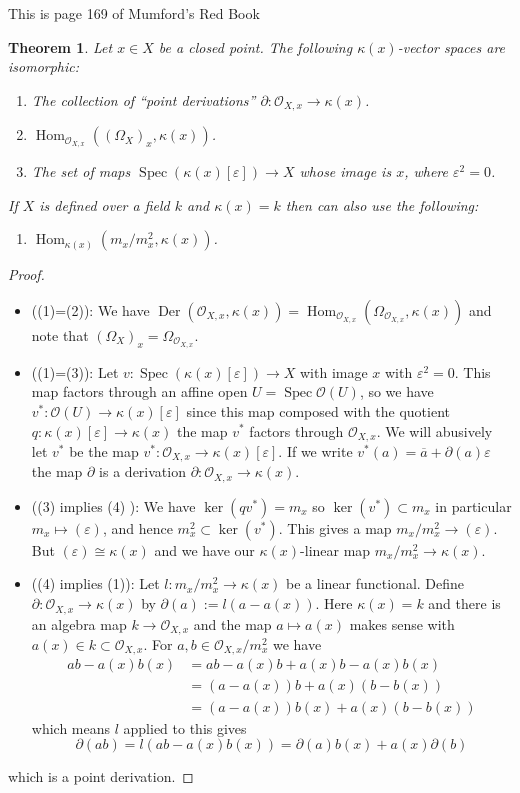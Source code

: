 \documentclass[12pt]{article}
\numberwithin{equation}{section}
\newtheorem{theorem}{Theorem}[subsection]
\theoremstyle{definition}
\theoremstyle{remark}
\newcommand{\Hom}{\operatorname{Hom}}
\newcommand{\Ocal}{\mathcal{O}}
\newcommand{\Spec}{\operatorname{Spec}}
\newcommand{\Der}{\operatorname{Der}}
\begin{document}
This is page 169 of Mumford's Red Book
\begin{theorem}
	Let $x\in X$ be a closed point. 
	The following $\kappa(x)$-vector spaces are isomorphic:
	\begin{enumerate}
		\item The collection of ``point derivations'' $\partial:\Ocal_{X,x}\to \kappa(x)$. 
		\item $\Hom_{\Ocal_{X,x}}((\Omega_{X})_x, \kappa(x))$.
		\item The set of maps $\Spec(\kappa(x)[\varepsilon]) \to X$ whose image is $x$, where $\varepsilon^2=0$.
	\end{enumerate}
If $X$ is defined over a field $k$ and $\kappa(x)=k$ then can also use the following:
\begin{enumerate}[resume]
		\item $\Hom_{\kappa(x)}(m_x/m_x^2,\kappa(x))$.
	\end{enumerate}
\end{theorem}

\begin{proof}
	\begin{itemize}
		\item ((1)=(2)): We have $\Der(\Ocal_{X,x},\kappa(x))=\Hom_{\Ocal_{X,x}}(\Omega_{\Ocal_{X,x}},\kappa(x))$ and note that $(\Omega_X)_x = \Omega_{\Ocal_{X,x}}$.
		\item ((1)=(3)): Let $v: \Spec(\kappa(x)[\varepsilon]) \to X$ with image $x$ with $\varepsilon^2=0$.
		This map factors through an affine open $U = \Spec\Ocal(U)$, so we have $v^*:\Ocal(U)\to \kappa(x)[\varepsilon]$ since this map composed with the quotient $q:\kappa(x)[\varepsilon] \to \kappa(x)$ the map $v^*$ factors through $\Ocal_{X,x}$. 
		We will abusively let $v^*$ be the map $v^*:\Ocal_{X,x}\to \kappa(x)[\varepsilon]$.
		If we write $v^*(a) = \overline{a} + \partial(a)\varepsilon$ the map $\partial$ is a derivation $\partial:\Ocal_{X,x} \to \kappa(x)$.
		\item ((3) implies (4) ): We have $\ker(qv^*)=m_x$ so $\ker(v^*) \subset m_x$ in particular $m_x\mapsto (\varepsilon)$, and hence $m_x^2 \subset \ker(v^*)$. 
		This gives a map $m_x/m_x^2 \to (\varepsilon)$. 
		But $(\varepsilon) \cong  \kappa(x)$ and we have our $\kappa(x)$-linear map $m_x/m_x^2 \to \kappa(x)$.
		\item ((4) implies (1)): Let $l:m_x/m_x^2\to \kappa(x)$ be a linear functional. Define $\partial: \Ocal_{X,x} \to \kappa(x)$ by $\partial(a) := l(a-a(x))$.
		Here $\kappa(x)=k$ and there is an algebra map $k\to \Ocal_{X,x}$ and the map $a\mapsto a(x)$ makes sense with $a(x)\in k\subset \Ocal_{X,x}$.
		For $a,b\in \Ocal_{X,x}/m_x^2$ we have 
		\begin{align*}
		ab-a(x)b(x) &= ab-a(x)b+a(x)b-a(x)b(x) \\
		&= (a-a(x))b+a(x)(b-b(x)) \\
		&= (a-a(x))b(x) + a(x)(b-b(x)) 
		\end{align*}
		which means $l$ applied to this gives 
		 $$\partial(ab)= l(ab-a(x)b(x) ) = \partial(a)b(x) + a(x) \partial(b)$$
	\end{itemize}
     which is a point derivation.
\end{proof}
\end{document}
